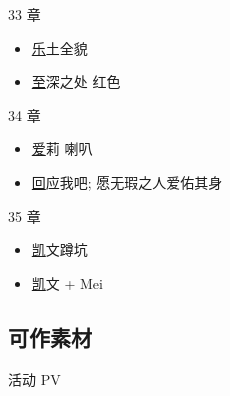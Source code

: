 \documentclass[a4paper]{article}
\begin{document}
33 章

\begin{itemize}
    \item \href{https://www.bilibili.com/video/BV1ZG4y1o7ie/?p=2&t=3333} 乐土全貌
    \item \href{https://www.bilibili.com/video/BV1ZG4y1o7ie/?p=2&t=3647} 至深之处 红色
\end{itemize}

34 章

\begin{itemize}
    \item \href{https://www.bilibili.com/video/BV1hK411r74y/?p=2&t=2380} 爱莉 喇叭
    \item \href{https://www.bilibili.com/video/BV1hK411r74y/?p=3&t=4084} 回应我吧; 愿无瑕之人爱佑其身
\end{itemize}

35 章

\begin{itemize}
    \item \href{https://www.bilibili.com/video/BV1BT411S7q4/?t=122} 凯文蹲坑
    \item \href{https://www.bilibili.com/video/BV1BT411S7q4/?p=5&t=3265} 凯文 + Mei
\end{itemize}

\subsection{可作素材}

活动 PV
\end{document}
